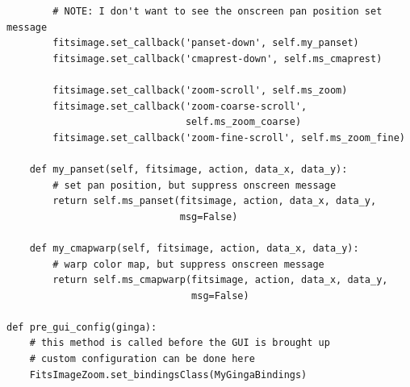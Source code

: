 \documentclass[11pt]{report}
\begin{document}
\begin{lstlisting}
        # NOTE: I don't want to see the onscreen pan position set message
        fitsimage.set_callback('panset-down', self.my_panset)
        fitsimage.set_callback('cmaprest-down', self.ms_cmaprest)

        fitsimage.set_callback('zoom-scroll', self.ms_zoom)
        fitsimage.set_callback('zoom-coarse-scroll',
                               self.ms_zoom_coarse)
        fitsimage.set_callback('zoom-fine-scroll', self.ms_zoom_fine)

    def my_panset(self, fitsimage, action, data_x, data_y):
        # set pan position, but suppress onscreen message
        return self.ms_panset(fitsimage, action, data_x, data_y,
                              msg=False)

    def my_cmapwarp(self, fitsimage, action, data_x, data_y):
        # warp color map, but suppress onscreen message
        return self.ms_cmapwarp(fitsimage, action, data_x, data_y,
                                msg=False)

def pre_gui_config(ginga):
    # this method is called before the GUI is brought up
    # custom configuration can be done here
    FitsImageZoom.set_bindingsClass(MyGingaBindings)
\end{lstlisting}
\end{document}
